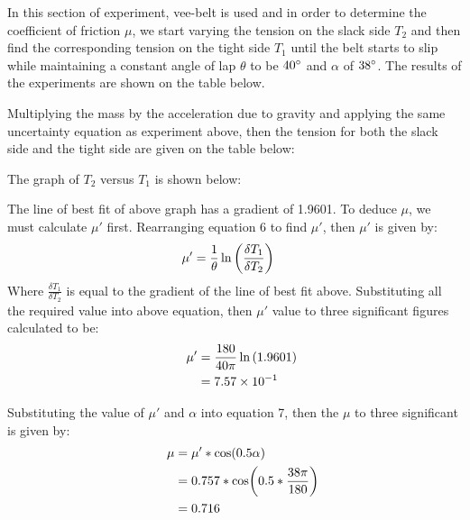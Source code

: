 In this section of experiment, vee-belt is used and in order to determine the coefficient of friction $\mu$, we start varying the tension on the slack side $T_2$ and then find the corresponding tension on the tight side $T_1$ until the belt starts to slip while maintaining a constant angle of lap $\theta$ to be $40\degree$ and $\alpha$ of $38\degree$. The results of the experiments are shown on the table below.


Multiplying the mass by the acceleration due to gravity and applying the same uncertainty equation as experiment above, then the tension for both the slack side and the tight side are given on the table below:


The graph of $T_2$ versus $T_1$ is shown below:


The line of best fit of above graph has a gradient of 1.9601. To deduce $\mu$, we must calculate $\mu '$ first. Rearranging equation 6 to find $\mu '$, then $\mu'$ is given by:
\begin{align}
\mu ' &= \frac{1}{\theta}\ln\left(\frac{\delta T_1}{\delta T_2}\right) \notag
\end{align}
Where $\frac{\delta T_1}{\delta T_2}$ is equal to the gradient of the line of best fit above. Substituting all the required value into above equation, then $\mu '$ value to three significant figures calculated to be:
\begin{align}
\mu ' &= \frac{180}{40\pi}\ln\left(1.9601\right) \notag \\
\qquad &= 7.57\times10^{-1} \notag
\end{align}

Substituting the value of $\mu '$ and $\alpha$ into equation 7, then the $\mu$ to three significant is given by:
\begin{align}
\mu &= \mu ' * \cos(0.5\alpha) \notag \\
\qquad &= 0.757* \cos(0.5*\frac{38\pi}{180}) \notag \\
\qquad &=  0.716 \notag
\end{align}